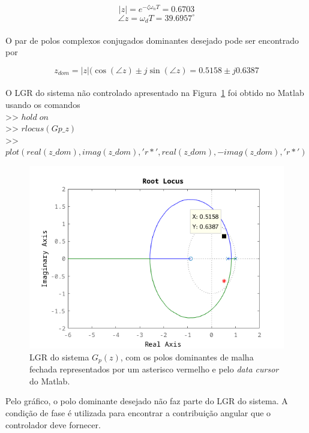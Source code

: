 \documentclass{article}
\begin{document}
        \[ |z| = e^{-\zeta\omega_nT} = 0.6703 \]
        \[ \angle z = \omega_dT = 39.6957^\circ \]\\

        {O par de polos complexos conjugados dominantes desejado pode ser
            encontrado por}

        \[ z_{dom} = |z|(\cos(\angle z) \pm j\sin(\angle z) = 0.5158 \pm j0.6387 \]\\

        {O LGR do sistema não controlado apresentado na Figura~\ref{fig:q2_lgr_descontrolado}
            foi obtido no Matlab usando os comandos\\
        >> $ hold \; on $\\
        >> $ rlocus(Gp\_z) $\\
        >> $ plot(real(z\_dom),imag(z\_dom),'r*',real(z\_dom),-imag(z\_dom),'r*') $ }\\

        \begin{figure}[H]
           \centering
                \includegraphics[width=1\linewidth]{images/q2_rlocus_uncontrolled.png}
                \caption{LGR do sistema $G_p(z)$, com os polos dominantes de
                    malha fechada representados por um asterisco vermelho e pelo
                    \textit{data cursor} do Matlab.}
                \label{fig:q2_lgr_descontrolado}
        \end{figure}

        {Pelo gráfico, o polo dominante desejado não faz parte do LGR do sistema.
            A condição de fase é utilizada para encontrar a contribuição angular
            que o controlador deve fornecer.}
\end{document}
